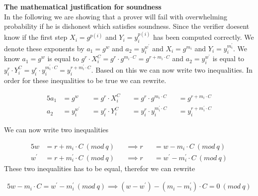 \noindent
\textbf{The mathematical justification for soundness}\\
In the following we are showing that a prover will fail with overwhelming probability if he is dishonest which satisfies soundness. Since the verifier doesent know if the first step $X_i=g^{p(i)}$ and $Y_i=y_i^{p(i)}$ has been computed correctly. We denote these exponents by \begin{math}a_1=g^w\end{math}    and \begin{math}a_2=y_i^{w^{'}}\end{math} and \begin{math}X_i=g^{m_i}\end{math}    and \begin{math}Y_i=y_i^{m_i^{'}}\end{math}. We know \begin{math} a_1= g^w \end{math} is equal to \begin{math}g^r  \cdot  X_i^C=g^r \cdot g^{m_i \cdot C} = g^{r+m_i \cdot C}\end{math} and \begin{math} a_2= y_i^{w^{'}}\end{math} is equal to \begin{math}y_i^r  \cdot  Y_i^C=y_i^r \cdot y_i^{m_i^{'} \cdot C} = y_i^{r+m_i^{'} \cdot C}\end{math}. Based on this we can now write two inequalities. In order for these inequalities to be true we can rewrite.

\begin{alignat*}{5}
 a_1 &= g^w &&= g^r  \cdot  X_i^C &&=g^r \cdot g^{m_i \cdot C} &&= g^{r+m_i \cdot C}\\
 a_2 &= y_i^{w^{'}} &&= y_i^r  \cdot  Y_i^C &&=y_i^r \cdot y_i^{m_i^{'} \cdot C} &&= y_i^{r+m_i^{'} \cdot C}
\end{alignat*}

\noindent
We can now write two inequalities

\begin{alignat*}{5}
 w &= r+m_i  \cdot  C\ (mod\ q) &&\implies r &&= w-m_i \cdot C\ (mod\ q)\\
 w^{'} &= r+m_i^{'}  \cdot  C\ (mod\ q) &&\implies r &&= w^{'}-m_i^{'}  \cdot  C\ (mod\ q)
\end{alignat*}
\noindent
These two inequalities has to be equal, therefor we can rewrite

\begin{alignat*}{5}
w-m_i \cdot C = w^{'}-m_i^{'}\ (mod\ q) \implies (w-w^{'})-(m_i - m_i^{'})  \cdot  C = 0 \ (mod\ q) 
\end{alignat*}


